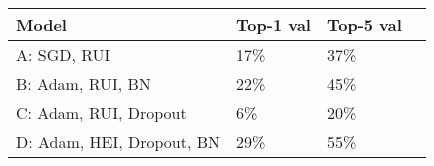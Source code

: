 

\begin{table}[htbp]
\begin{center}
\begin{tabular}{|l|l|l|l|}
\hline
\textbf{Model} & \textbf{Top-1 val} & \textbf{Top-5 val}  \\
\hline
          A: SGD, RUI                &   17\%  		  &  37\% \\
          B: Adam, RUI, BN           &   22\%  		  &  45\% \\
          C: Adam, RUI, Dropout      &   6\%      	&  20\% \\
          D: Adam, HEI, Dropout, BN  &   29\%  	    &  55\% \\

\hline
\end{tabular}
\label{table:accuracy4}
\end{center}
\end{table}
